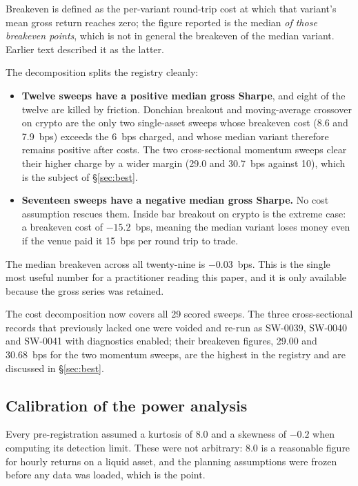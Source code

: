 \documentclass[11pt,a4paper]{article}
\begin{document}
Breakeven is defined as the per-variant round-trip cost at which that
variant's mean gross return reaches zero; the figure reported is the median
\emph{of those breakeven points}, which is not in general the breakeven of the
median variant. Earlier text described it as the latter.

The decomposition splits the registry cleanly:

\begin{itemize}
\item \textbf{Twelve sweeps have a positive median gross Sharpe}, and eight of
      the twelve are killed by friction. Donchian breakout and moving-average crossover on crypto
      are the only two single-asset sweeps whose breakeven cost (8.6 and 7.9~bps)
      exceeds the 6~bps charged, and whose median variant therefore remains
      positive after costs. The two cross-sectional momentum sweeps clear their
      higher charge by a wider margin (29.0 and 30.7~bps against 10), which is
      the subject of \S\ref{sec:best}.
\item \textbf{Seventeen sweeps have a negative median gross Sharpe.} No cost
      assumption rescues them. Inside bar breakout on crypto is the extreme
      case: a breakeven cost of $-15.2$~bps, meaning the median variant loses
      money even if the venue paid it 15~bps per round trip to trade.
\end{itemize}

The median breakeven across all twenty-nine is $-0.03$~bps. This is the single
most useful number for a practitioner reading this paper, and it is only
available because the gross series was retained.

The cost decomposition now covers all 29 scored sweeps. The three cross-sectional records that previously lacked one were voided and re-run as SW-0039, SW-0040 and SW-0041 with diagnostics enabled; their breakeven figures, 29.00 and 30.68~bps for the two momentum sweeps, are the highest in the registry and are discussed in \S\ref{sec:best}.

\subsection{Calibration of the power analysis}

Every pre-registration assumed a kurtosis of 8.0 and a skewness of $-0.2$ when
computing its detection limit. These were not arbitrary: 8.0 is a reasonable
figure for hourly returns on a liquid asset, and the planning assumptions were
frozen before any data was loaded, which is the point.
\end{document}
